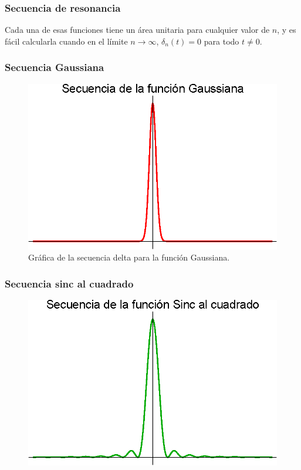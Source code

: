 \documentclass[12pt]{beamer}
\begin{document}
\begin{frame}
\frametitle{Secuencia de resonancia}    
Cada una de esas funciones tiene un área unitaria para cualquier valor de $n$, y es fácil calcularla cuando en el límite $n \to \infty$, $\delta_{n} (t) = 0$ para todo $t \neq 0$.
\end{frame}
\begin{frame}
\frametitle{Secuencia Gaussiana}
\begin{figure}[H]
    \centering
    \includegraphics[scale=1]{Imagenes/secuencia_Delta_06.eps}
    \caption{Gráfica de la secuencia delta para la función Gaussiana.}
\end{figure}
\end{frame}
\begin{frame}
\frametitle{Secuencia sinc al cuadrado}
\begin{figure}[H]
    \centering
    \includegraphics[scale=1]{Imagenes/secuencia_Delta_07.eps}
\end{figure}
\end{frame}
\end{document}
